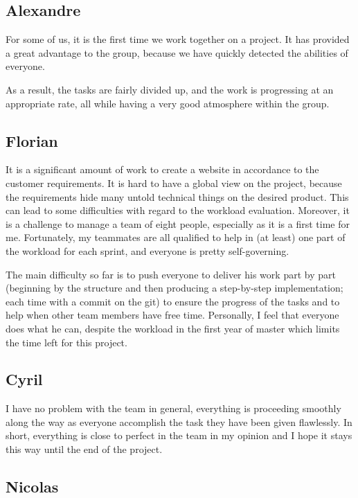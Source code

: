 \subsection{Alexandre}

For some of us, it is the first time we work together on a project. It has provided a great advantage to the group, because we have quickly detected the abilities of everyone. \newline

As a result, the tasks are fairly divided up, and the work is progressing at an appropriate rate, all while having a very good atmosphere within the group.

\subsection{Florian}
It is a significant amount of work to create a website in accordance to the customer requirements. It is hard to have a global view on the project, because the requirements hide many untold technical things on the desired product. This can lead to some difficulties with regard to the workload evaluation. Moreover, it is a challenge to manage a team of eight people, especially as it is a first time for me. Fortunately, my
teammates are all qualified to help in (at least) one part of the workload for
each sprint, and everyone is pretty self-governing. \newline

The main difficulty so far is to push everyone to deliver his work part by
part (beginning by the structure and then producing a step-by-step
implementation; each time with a commit on the git) to ensure the progress
of the tasks and to help when other team members have free time.
Personally, I feel that everyone does what he can, despite the workload in
the first year of master which limits the time left for this project.\newline
\subsection{Cyril}

I have no problem with the team in general, everything is proceeding
smoothly along the way as everyone accomplish the task they have been given
flawlessly. In short, everything is close to perfect in the team in my
opinion and I hope it stays this way until the end of the project.
\subsection{Nicolas}
